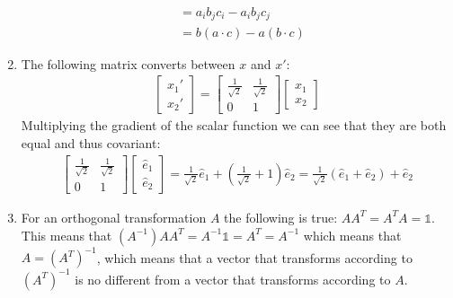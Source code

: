 \documentclass[12pt]{article}
\begin{document}
\begin{enumerate}
\begin{align}
            & =a_i b_j c_i-a_i b_j c_j\\
            & =b(a\cdot c)-a(b\cdot c)
        \end{align}
        \item The following matrix converts between $x$ and $x'$:
        \begin{gather}
            \begin{bmatrix}
                x_1' \\
                x_2'
            \end{bmatrix}=
            \begin{bmatrix}
                \frac{1}{\sqrt{2}} & \frac{1}{\sqrt{2}} \\
                0                  & 1
            \end{bmatrix}
            \begin{bmatrix}
                x_1 \\
                x_2
            \end{bmatrix}
        \end{gather}
        Multiplying the gradient of the scalar function we can see that they are both equal and thus covariant:
        \begin{gather}
            \begin{bmatrix}
                \frac{1}{\sqrt{2}} & \frac{1}{\sqrt{2}} \\
                0                  & 1
            \end{bmatrix}
            \begin{bmatrix}
                \hat{e}_1 \\
                \hat{e}_2
            \end{bmatrix}=\frac{1}{\sqrt{2}}\hat{e}_1+\left(\frac{1}{\sqrt{2}}+1\right)\hat{e}_2=\frac{1}{\sqrt{2}}\left( \hat{e}_1+\hat{e}_2\right)+\hat{e}_2
        \end{gather}
        \item For an orthogonal transformation $A$ the following is true: $AA^T=A^T A=\mathbb{1}$.
        This means that $(A^{-1})AA^T=A^{-1}\mathbb{1}=A^T=A^{-1}$ which means that $A=(A^T)^{-1}$, which means that a vector that transforms according to $(A^T)^{-1}$ is no different from a vector that transforms according to $A$.
    \end{enumerate}
\end{document}
